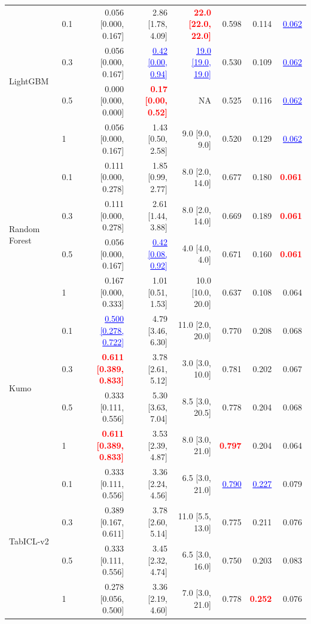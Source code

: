 \begin{table}[pos=!htbp,align=\centering]
{\begin{tabular}{llrrrrrr}
\midrule
\multirow{4}{*}{LightGBM} & 0.1 & 0.056 [0.000, 0.167] & 2.86 [1.78, 4.09] & \textcolor{red}{\textbf{22.0 [22.0, 22.0]}} & 0.598 & 0.114 & \textcolor{blue}{\underline{0.062}} \\
 & 0.3 & 0.056 [0.000, 0.167] & \textcolor{blue}{\underline{0.42 [0.00, 0.94]}} & \textcolor{blue}{\underline{19.0 [19.0, 19.0]}} & 0.530 & 0.109 & \textcolor{blue}{\underline{0.062}} \\
 & 0.5 & 0.000 [0.000, 0.000] & \textcolor{red}{\textbf{0.17 [0.00, 0.52]}} & NA & 0.525 & 0.116 & \textcolor{blue}{\underline{0.062}} \\
 & 1 & 0.056 [0.000, 0.167] & 1.43 [0.50, 2.58] & 9.0 [9.0, 9.0] & 0.520 & 0.129 & \textcolor{blue}{\underline{0.062}} \\
\midrule
\multirow{4}{*}{Random Forest} & 0.1 & 0.111 [0.000, 0.278] & 1.85 [0.99, 2.77] & 8.0 [2.0, 14.0] & 0.677 & 0.180 & \textcolor{red}{\textbf{0.061}} \\
 & 0.3 & 0.111 [0.000, 0.278] & 2.61 [1.44, 3.88] & 8.0 [2.0, 14.0] & 0.669 & 0.189 & \textcolor{red}{\textbf{0.061}} \\
 & 0.5 & 0.056 [0.000, 0.167] & \textcolor{blue}{\underline{0.42 [0.08, 0.92]}} & 4.0 [4.0, 4.0] & 0.671 & 0.160 & \textcolor{red}{\textbf{0.061}} \\
 & 1 & 0.167 [0.000, 0.333] & 1.01 [0.51, 1.53] & 10.0 [10.0, 20.0] & 0.637 & 0.108 & 0.064 \\
\midrule
\multirow{4}{*}{Kumo} & 0.1 & \textcolor{blue}{\underline{0.500 [0.278, 0.722]}} & 4.79 [3.46, 6.30] & 11.0 [2.0, 20.0] & 0.770 & 0.208 & 0.068 \\
 & 0.3 & \textcolor{red}{\textbf{0.611 [0.389, 0.833]}} & 3.78 [2.61, 5.12] & 3.0 [3.0, 10.0] & 0.781 & 0.202 & 0.067 \\
 & 0.5 & 0.333 [0.111, 0.556] & 5.30 [3.63, 7.04] & 8.5 [3.0, 20.5] & 0.778 & 0.204 & 0.068 \\
 & 1 & \textcolor{red}{\textbf{0.611 [0.389, 0.833]}} & 3.53 [2.39, 4.87] & 8.0 [3.0, 21.0] & \textcolor{red}{\textbf{0.797}} & 0.204 & 0.064 \\
\midrule
\multirow{4}{*}{TabICL-v2} & 0.1 & 0.333 [0.111, 0.556] & 3.36 [2.24, 4.56] & 6.5 [3.0, 21.0] & \textcolor{blue}{\underline{0.790}} & \textcolor{blue}{\underline{0.227}} & 0.079 \\
 & 0.3 & 0.389 [0.167, 0.611] & 3.78 [2.60, 5.14] & 11.0 [5.5, 13.0] & 0.775 & 0.211 & 0.076 \\
 & 0.5 & 0.333 [0.111, 0.556] & 3.45 [2.32, 4.74] & 6.5 [3.0, 16.0] & 0.750 & 0.203 & 0.083 \\
 & 1 & 0.278 [0.056, 0.500] & 3.36 [2.19, 4.60] & 7.0 [3.0, 21.0] & 0.778 & \textcolor{red}{\textbf{0.252}} & 0.076 \\
\bottomrule
\end{tabular}
}
\end{table}
